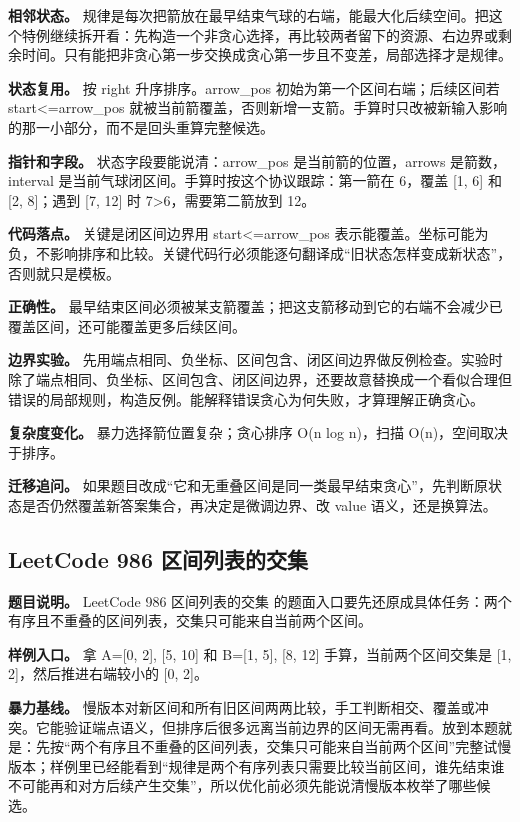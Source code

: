\textbf{相邻状态。} 规律是每次把箭放在最早结束气球的右端，能最大化后续空间。把这个特例继续拆开看：先构造一个非贪心选择，再比较两者留下的资源、右边界或剩余时间。只有能把非贪心第一步交换成贪心第一步且不变差，局部选择才是规律。

\textbf{状态复用。} 按 right 升序排序。arrow\_pos 初始为第一个区间右端；后续区间若 start<=arrow\_pos 就被当前箭覆盖，否则新增一支箭。手算时只改被新输入影响的那一小部分，而不是回头重算完整候选。

\textbf{指针和字段。} 状态字段要能说清：arrow\_pos 是当前箭的位置，arrows 是箭数，interval 是当前气球闭区间。手算时按这个协议跟踪：第一箭在 6，覆盖 [1, 6] 和 [2, 8]；遇到 [7, 12] 时 7>6，需要第二箭放到 12。

\textbf{代码落点。} 关键是闭区间边界用 start<=arrow\_pos 表示能覆盖。坐标可能为负，不影响排序和比较。关键代码行必须能逐句翻译成“旧状态怎样变成新状态”，否则就只是模板。

\textbf{正确性。} 最早结束区间必须被某支箭覆盖；把这支箭移动到它的右端不会减少已覆盖区间，还可能覆盖更多后续区间。

\textbf{边界实验。} 先用端点相同、负坐标、区间包含、闭区间边界做反例检查。实验时除了端点相同、负坐标、区间包含、闭区间边界，还要故意替换成一个看似合理但错误的局部规则，构造反例。能解释错误贪心为何失败，才算理解正确贪心。

\textbf{复杂度变化。} 暴力选择箭位置复杂；贪心排序 O(n log n)，扫描 O(n)，空间取决于排序。

\textbf{迁移追问。} 如果题目改成“它和无重叠区间是同一类最早结束贪心”，先判断原状态是否仍然覆盖新答案集合，再决定是微调边界、改 value 语义，还是换算法。

\subsection{LeetCode 986 区间列表的交集}

\textbf{题目说明。} LeetCode 986 区间列表的交集 的题面入口要先还原成具体任务：两个有序且不重叠的区间列表，交集只可能来自当前两个区间。

\textbf{样例入口。} 拿 A=[0, 2], [5, 10] 和 B=[1, 5], [8, 12] 手算，当前两个区间交集是 [1, 2]，然后推进右端较小的 [0, 2]。

\textbf{暴力基线。} 慢版本对新区间和所有旧区间两两比较，手工判断相交、覆盖或冲突。它能验证端点语义，但排序后很多远离当前边界的区间无需再看。放到本题就是：先按“两个有序且不重叠的区间列表，交集只可能来自当前两个区间”完整试慢版本；样例里已经能看到“规律是两个有序列表只需要比较当前区间，谁先结束谁不可能再和对方后续产生交集”，所以优化前必须先能说清慢版本枚举了哪些候选。

